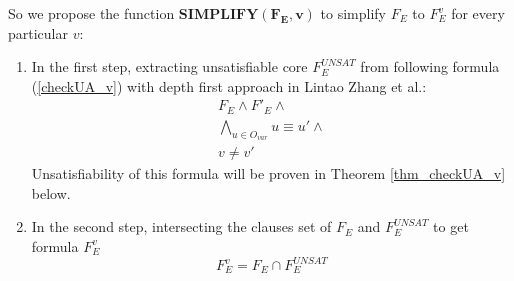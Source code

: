 \documentclass[journal]{IEEEtran}
\begin{document}
So we propose the function $\boldsymbol{SIMPLIFY(F_E,v)}$ to simplify $F_E$ to $F_E^v$ for every particular $v$:
\begin{enumerate}
\item In the first step,
extracting unsatisfiable core $F_E^{UNSAT}$ from following formula (\ref{checkUA_v}) with depth first approach in Lintao Zhang et al.\cite{VALIDSAT}:
\begin{equation}\label{checkUA_v}
\begin{array}{c}
F_E\wedge F'_E\wedge \\
\bigwedge_{u\in O_{var}} u\equiv u'\wedge \\
v\ne v'
\end{array}
\end{equation}
Unsatisfiability of this formula will be proven in Theorem \ref{thm_checkUA_v} below.
\item In the second step,
intersecting the clauses set of $F_E$ and $F_E^{UNSAT}$ to get formula $F_E^v$
\begin{equation}\label{checkUA_fev}
F_E^v=F_E\cap F_E^{UNSAT}
\end{equation}
\end{enumerate}
\end{document}
